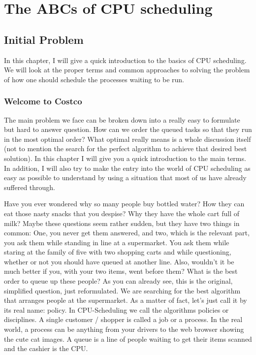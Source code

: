 \chapter{The ABCs of CPU scheduling}

\section{Initial Problem}

In this chapter, I will give a quick introduction to the basics of CPU scheduling. We will look at the proper terms and common approaches to solving the problem of how one should schedule the processes waiting to be run.

\subsection{Welcome to Costco}

The main problem we face can be broken down into a really easy to formulate but hard to answer question.
How can we order the queued tasks so that they run in the most optimal order?
What optimal really means is a whole discussion itself (not to mention the search for the perfect algorithm to achieve that desired best solution).
In this chapter I will give you a quick introduction to the main terms.
In addition, I will also try to make the entry into the world of CPU scheduling as easy as possible to understand by using a situation that most of us have already suffered through.

Have you ever wondered why so many people buy bottled water? 
How they can eat those nasty snacks that you despise?
Why they have the whole cart full of milk?
Maybe these questions seem rather sudden, but they have two things in common:
One, you never get them answered, and two, which is the relevant part, you ask them while standing in line at a supermarket.
You ask them while staring at the family of five with two shopping carts and while questioning, whether or not you should have queued at another line.
Also, wouldn't it be much better if you, with your two items, went before them?
What is the best order to queue up these people?
As you can already see, this is the original, simplified question, just reformulated.
We are searching for the best algorithm that arranges people at the supermarket.
As a matter of fact, let's just call it by its real name: policy.
In CPU-Scheduling we call the algorithms policies or disciplines.
A single customer / shopper is called a job or a process.
In the real world, a process can be anything from your drivers to the web browser showing the cute cat images.
A queue is a line of people waiting to get their items scanned and the cashier is the CPU.

